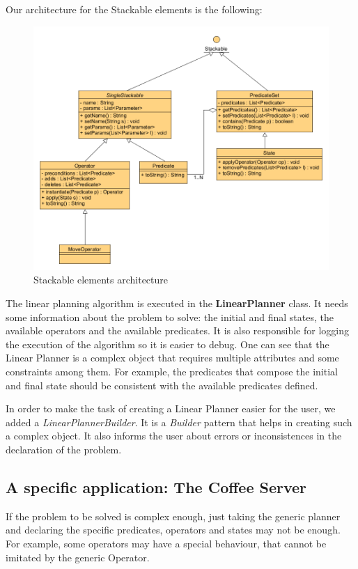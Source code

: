\documentclass[12pt,a4paper,oneside]{article}
\numberwithin{equation}{section}
\numberwithin{equation}{section}
\theoremstyle{definition}
\begin{document}
Our architecture for the Stackable elements is the following:

\begin{figure}[H]
	\centering
	\includegraphics[scale=0.4]{figures/stackable_hierarchy.png}
	\caption{Stackable elements architecture}
	\label{stackable} 
\end{figure}


The linear planning algorithm is executed in the \textbf{LinearPlanner} class. It needs some information about the problem to solve: the initial and final states, the available operators and the available predicates. It is also responsible for logging the execution of the algorithm so it is easier to debug. One can see that the Linear Planner is a complex object that requires multiple attributes and some constraints among them. For example, the predicates that compose the initial and final state should be consistent with the available predicates defined.

In order to make the task of creating a Linear Planner easier for the user, we added a \textit{LinearPlannerBuilder}. It is a \textit{Builder} pattern that helps in creating such a complex object. It also informs the user about errors or inconsistences in the declaration of the problem.


\subsection{A specific application: The Coffee Server}

If the problem to be solved is complex enough, just taking the generic planner and declaring the specific predicates, operators and states may not be enough. For example, some operators may have a special behaviour, that cannot be imitated by the generic Operator.
\end{document}
